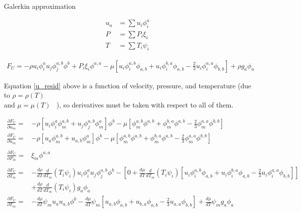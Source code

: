 Galerkin approximation

\begin{align*}
    u_a &= \sum u_i \phi_i^a\\
    P &= \sum P_i \xi_i\\
    T &= \sum T_i \psi_i
\end{align*}

\begin{align}
    F_U =  -\rho u_i \phi_i^a u_j \phi_j^{a,b} \phi^b + P_i \xi_i \phi^{a,a} - \mu \left [u_i \phi_i^{a,b} \phi_{a,b} + u_i \phi_i^{b,a} \phi_{a,b} - \frac{2}{3} u_i \phi_i^{a,a} \phi_{b,b} \right ] + \rho g_a \phi_a \label{u_resid}
\end{align}

Equation \ref{u_resid} above is a function of velocity, pressure, and temperature (due to $\rho = \rho(T)$ \\and $\mu = \mu(T)$ \ ), so derivatives must be taken with respect to all of them.

\begin{align}
   \frac{\partial F_U}{\partial u_m} = &-\rho \left [ u_i \phi_i^a \phi_m^{a,b} + u_j \phi_j^{a,b} \phi_m^a \right ] \phi^b 
        - \mu \left [\phi_m^{a,b} \phi^{a,b} + \phi_m^{b,a} \phi^{a,b} - \frac{2}{3} \phi_m^{a,a} \phi^{b,b} \right ] \nonumber \\     
   \frac{\partial F_U}{\partial u_m} = &-\rho \left [ u_a \phi_m^{a,b} + u_{a,b} \phi_m^a \right ] \phi^b - \mu \left [\phi_m^{a,b} \phi^{a,b} + \phi_m^{b,a} \phi^{a,b} - \frac{2}{3} \phi_m^{a,a} \phi^{b,b} \right ] \label{du_du}\\
   \nonumber \\ 
   \frac{\partial F_U}{\partial P_m} = &\xi_m \phi^{a,a} \label{du_dp} \\
   \nonumber \\
   \frac{\partial F_U}{\partial T_m} = &-\frac{d\rho}{dT} \frac{d}{dT_m}(T_i \psi_i) u_i \phi_i^a u_j \phi_j^{a,b} \phi^b
        - \left[ 0 + \frac{d\mu}{dT} \frac{d}{dT_m}(T_i \psi_i) [u_i \phi_i^{a,b} \phi_{a,b} + u_i \phi_i^{b,a} \phi_{a,b} - \frac{2}{3} u_i \phi_i^{a,a} \phi_{b,b} ] \right ] \nonumber
        \\ &+ \frac{d\rho}{dT} \frac{d}{dT_m}(T_i \psi_i) g_a \phi_a \nonumber \\       
   \frac{\partial F_U}{\partial T_m} = &-\frac{d\rho}{dT} \psi_m u_a u_{a,b} \phi^b
        - \frac{d\mu}{dT} \psi_m \left [u_{a,b} \phi_{a,b} + u_{b,a} \phi_{a,b} - \frac{2}{3} u_{a,a} \phi_{b,b} \right ]
        + \frac{d\rho}{dT} \psi_m g_a \phi_a \label{du_dT} 
\end{align}

